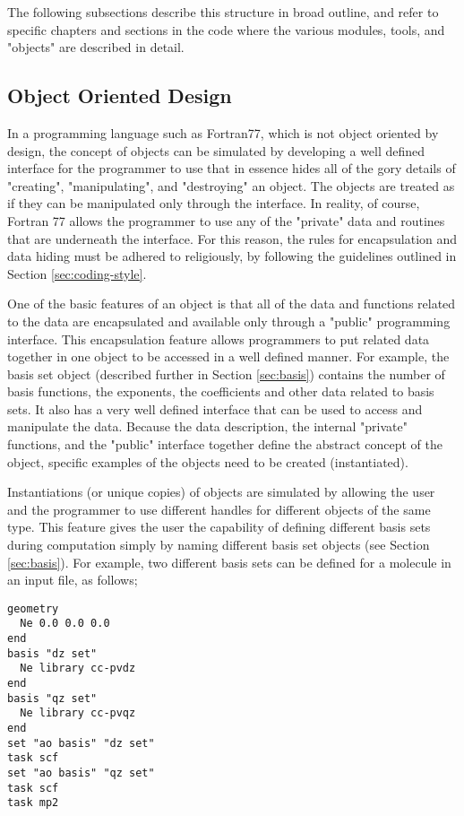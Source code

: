 The following subsections describe this structure in broad outline, and refer
to specific chapters and sections in the code where
the various modules, tools, and "objects" are described in detail.


\subsection{Object Oriented Design}
\label{sec:ood}

In a programming language such as Fortran77, which is not object oriented by
design, the concept of objects can be simulated  by developing a
well defined interface
for the programmer to use that in essence hides all of the gory details of 
"creating", "manipulating", and "destroying" an object.  The objects are
treated as if they
can be manipulated only through the interface.  In reality, of course, Fortran 77
allows the programmer to use any of the "private" data and routines
that are underneath the interface.  For this reason, the rules for encapsulation
and data hiding must be adhered to religiously, by following the guidelines outlined
in Section \ref{sec:coding-style}.

One of the basic features of an object is that all of the data and
functions related to the data are encapsulated and available only through
a "public" programming interface.  This encapsulation feature allows 
programmers to put related
data together in one object to be accessed in a well defined manner.
For example, the basis set object (described further in Section
\ref{sec:basis}) contains the number of basis functions, the
exponents, the coefficients and other data related to basis sets.
It also has a very well defined interface that can be used to access and
manipulate the data.  Because the data description, the internal "private"
functions, and the "public" interface together 
define the abstract concept of the object, specific examples of the
objects need to be created (instantiated).

Instantiations (or unique copies) of objects are simulated by allowing 
the user and the programmer to use different handles for different 
objects of the same type.
This feature gives the user the capability of defining
different basis sets during computation simply by naming different
basis
set objects (see Section \ref{sec:basis}).  For example, two different basis sets
can be defined for a molecule in an input file, as follows;

\begin{verbatim}
geometry
  Ne 0.0 0.0 0.0
end
basis "dz set"
  Ne library cc-pvdz
end
basis "qz set"
  Ne library cc-pvqz
end
set "ao basis" "dz set"
task scf
set "ao basis" "qz set"
task scf
task mp2
\end{verbatim}

